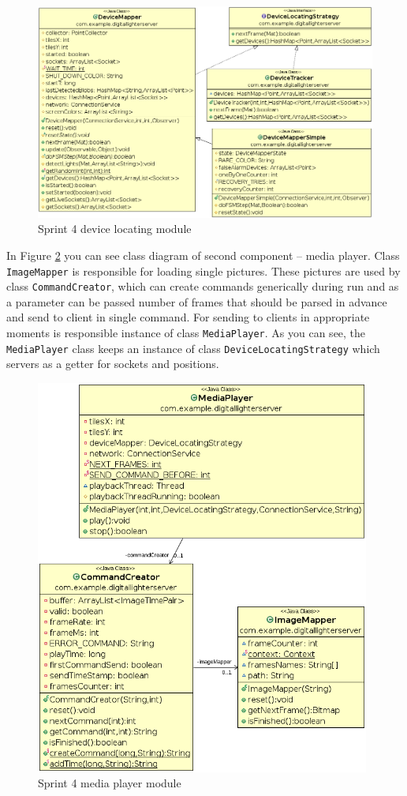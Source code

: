 \begin{figure}[h]
	\centering
		\includegraphics[width=16.2cm]{sprint4/class_diagram_device.png}
	\caption{Sprint 4 device locating module}
	\label{fig:class_diagram_device_sprint4}
\end{figure}

In Figure \ref{fig:class_diagram_device_sprint4b} you can see class diagram of second component -- media player.
Class \texttt{ImageMapper} is responsible for loading single pictures.
These pictures are used by class \texttt{CommandCreator}, which can create commands generically during run
and as a parameter can be passed number of frames that should be parsed in advance and send to client in single command.
For sending to clients in appropriate moments is responsible instance of class \texttt{MediaPlayer}.
As you can see, the \texttt{MediaPlayer} class keeps an instance of class \texttt{DeviceLocatingStrategy} which servers as a getter for sockets and positions.
\begin{figure}[h]
	\centering
		\includegraphics[width=11.0cm]{sprint4/class_diagram_media_player.png}
	\caption{Sprint 4 media player module}
	\label{fig:class_diagram_device_sprint4b}
\end{figure}


